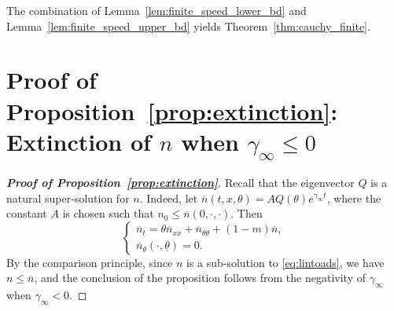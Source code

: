 \documentclass[11pt]{article}    %
\begin{document}
The combination of Lemma~\ref{lem:finite_speed_lower_bd} and Lemma~\ref{lem:finite_speed_upper_bd} yields Theorem~\ref{thm:cauchy_finite}.









\section{Proof of Proposition~\ref{prop:extinction}: Extinction of $n$ when $\gamma_\infty \leq 0$}


\begin{proof}[{\bf Proof of  Proposition~\ref{prop:extinction}}]
Recall that the eigenvector $Q$ is a natural super-solution for $n$. Indeed, let $\overline n(t,x,\theta) = A Q(\theta)e^{\gamma_\infty t}$, where the constant $A$ is chosen such that $n_0 \leq \overline n(0,\cdot,\cdot)$. Then %
\begin{equation}\label{eq:lintoads}
\begin{cases}
	\overline n_t = \theta \overline n_{xx} + \overline n_{\theta\theta} + \left( 1 - m \right)  \overline n,\\
	\overline n_\theta(\cdot,\underline\theta) = 0.
	\end{cases}
\end{equation}
By the comparison principle, since $n$ is a sub-solution to  \eqref{eq:lintoads}, we have $n \leq \overline n$, and the conclusion of the proposition follows from the negativity of $\gamma_\infty$ when $\gamma_\infty<0$.


\end{proof}
\end{document}

